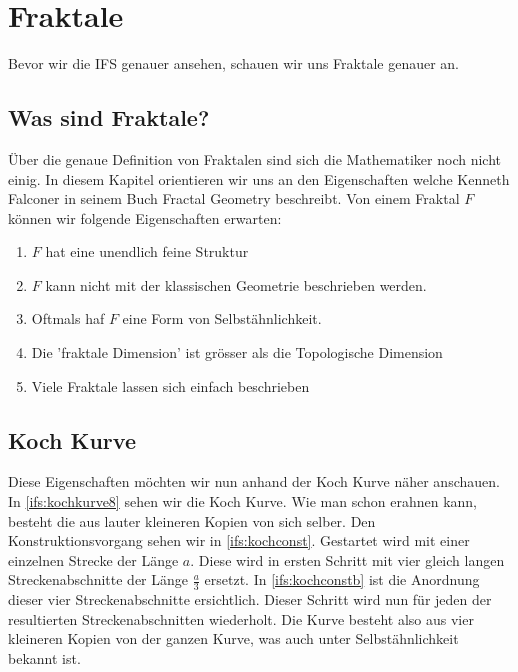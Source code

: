 %
%
%
\section{Fraktale
\label{ifs:section:teil1}}
Bevor wir die IFS genauer ansehen, schauen wir uns Fraktale genauer an.

\subsection{Was sind Fraktale?
\label{ifs:subsection:finibus}}
Über die genaue Definition von Fraktalen sind sich die Mathematiker noch nicht einig. 
In diesem Kapitel orientieren wir uns an den Eigenschaften welche Kenneth Falconer in seinem Buch Fractal Geometry beschreibt.
Von einem Fraktal $F$ können wir folgende Eigenschaften erwarten:
\begin{enumerate}
	\item $F$ hat eine unendlich feine Struktur
	\item $F$ kann nicht mit der klassischen Geometrie beschrieben werden.
	\item Oftmals haf $F$ eine Form von Selbstähnlichkeit.
	\item Die 'fraktale Dimension' ist grösser als die Topologische Dimension
	\item Viele Fraktale lassen sich einfach beschrieben
\end{enumerate}
\subsection{Koch Kurve
	\label{ifs:subsection:lilkoch}}
Diese Eigenschaften möchten wir nun anhand der Koch Kurve näher anschauen.
In \ref{ifs:kochkurve8} sehen wir die Koch Kurve. Wie man schon erahnen kann, besteht die aus lauter kleineren Kopien von sich selber. 
Den Konstruktionsvorgang sehen wir in \ref{ifs:kochconst}.
Gestartet wird mit einer einzelnen Strecke der Länge $a$.
Diese wird in ersten Schritt mit vier gleich langen Streckenabschnitte der Länge $\frac{a}{3}$ ersetzt.
In \ref{ifs:kochconstb} ist die Anordnung dieser vier Streckenabschnitte ersichtlich. 
Dieser Schritt wird nun für jeden der resultierten Streckenabschnitten wiederholt.
Die Kurve besteht also aus vier kleineren Kopien von der ganzen Kurve, was auch unter Selbstähnlichkeit bekannt ist.


